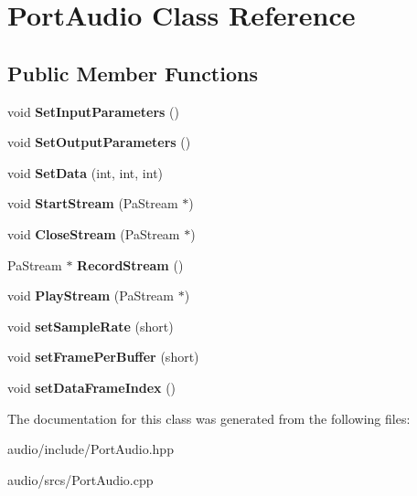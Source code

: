 \hypertarget{class_port_audio}{}\section{Port\+Audio Class Reference}
\label{class_port_audio}
\subsection*{Public Member Functions}
\begin{DoxyCompactItemize}
\item 
\mbox{\label{class_port_audio_aba9d07307c1d1da76f60b34c36e7b307}} 
void {\bfseries Set\+Input\+Parameters} ()
\item 
\mbox{\label{class_port_audio_ab6c65dcf34b99509ef98eb6025f3f2c9}} 
void {\bfseries Set\+Output\+Parameters} ()
\item 
\mbox{\label{class_port_audio_adbe0192928bae24d0d469b39561b9859}} 
void {\bfseries Set\+Data} (int, int, int)
\item 
\mbox{\label{class_port_audio_a0da7ed31a1a6e38800c4f4e2e179565f}} 
void {\bfseries Start\+Stream} (Pa\+Stream $\ast$)
\item 
\mbox{\label{class_port_audio_acb0f54f9382bc8da31d2a39bcf88bb36}} 
void {\bfseries Close\+Stream} (Pa\+Stream $\ast$)
\item 
\mbox{\label{class_port_audio_a0096f886eec6c33ae24b4610f9ee3fcb}} 
Pa\+Stream $\ast$ {\bfseries Record\+Stream} ()
\item 
\mbox{\label{class_port_audio_ac3d84aa081e68ed4b6b32e901a25ea8c}} 
void {\bfseries Play\+Stream} (Pa\+Stream $\ast$)
\item 
\mbox{\label{class_port_audio_a8d6e5890ce34df315cbb76b2399d1876}} 
void {\bfseries set\+Sample\+Rate} (short)
\item 
\mbox{\label{class_port_audio_ad86fa6db404b8f563b7eb92c1b4359b5}} 
void {\bfseries set\+Frame\+Per\+Buffer} (short)
\item 
\mbox{\label{class_port_audio_a42e4b5882022a7ccd8696d9656ea686d}} 
void {\bfseries set\+Data\+Frame\+Index} ()
\end{DoxyCompactItemize}


The documentation for this class was generated from the following files\+:\begin{DoxyCompactItemize}
\item 
audio/include/Port\+Audio.\+hpp\item 
audio/srcs/Port\+Audio.\+cpp\end{DoxyCompactItemize}
